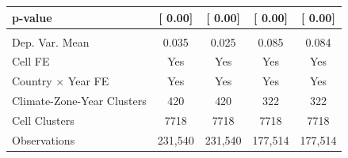 {\begin{tabular}{l*{4}{c}}
\hspace{25pt} p-value& [     0.00]         & [     0.00]         & [     0.00]         & [     0.00]         \\
\hline \\ Dep. Var. Mean&       0.035         &       0.025         &       0.085         &       0.084         \\
Cell FE             &         Yes         &         Yes         &         Yes         &         Yes         \\
Country $\times$ Year FE&         Yes         &         Yes         &         Yes         &         Yes         \\
Climate-Zone-Year Clusters&         420         &         420         &         322         &         322         \\
Cell Clusters       &        7718         &        7718         &        7718         &        7718         \\
Observations        &     231,540         &     231,540         &     177,514         &     177,514         \\
\bottomrule
\end{tabular}
}
